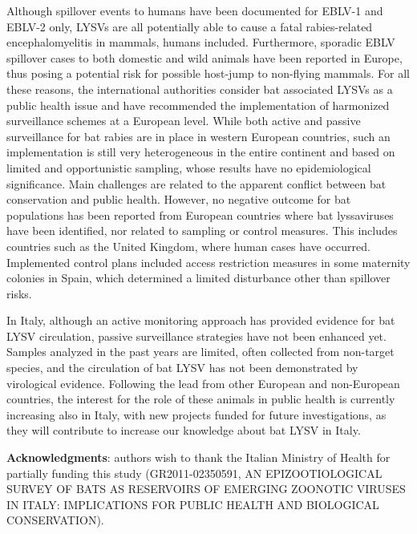 {Although spillover events to humans have been documented for EBLV-1 and EBLV-2 only, LYSVs are all potentially able to cause a fatal rabies-related encephalomyelitis in mammals, humans included. Furthermore, sporadic EBLV spillover cases to both domestic and wild animals have been reported in Europe, thus posing a potential risk for possible host-jump to non-flying mammals. For all these reasons, the international authorities consider bat associated LYSVs as a public health issue and have recommended the implementation of harmonized surveillance schemes at a European level. While both active and passive surveillance for bat rabies are in place in western European countries, such an implementation is still very heterogeneous in the entire continent and based on limited and opportunistic sampling, whose results have no epidemiological significance. Main challenges are related to the apparent conflict between bat conservation and public health. However, no negative outcome for bat populations has been reported from European countries where bat lyssaviruses have been identified, nor related to sampling or control measures. This includes countries such as the United Kingdom, where human cases have occurred. Implemented control plans included access restriction measures in some maternity colonies in Spain, which determined a limited disturbance other than spillover risks.

In Italy, although an active monitoring approach has provided evidence for bat LYSV circulation, passive surveillance strategies have not been enhanced yet. Samples analyzed in the past years are limited, often collected from non-target species, and the circulation of bat LYSV has not been demonstrated by virological evidence. Following the lead from other European and non-European countries, the interest for the role of these animals in public health is currently increasing also in Italy, with new projects funded for future investigations, as they will contribute to increase our knowledge about bat LYSV in Italy.

\vskip3mm
\begin{footnotesize}
\textbf{Acknowledgments}: authors wish to thank the Italian Ministry of Health for partially funding this study (GR2011-02350591, AN EPIZOOTIOLOGICAL SURVEY OF BATS AS RESERVOIRS OF EMERGING ZOONOTIC VIRUSES IN ITALY: IMPLICATIONS FOR PUBLIC HEALTH AND BIOLOGICAL CONSERVATION).
\end{footnotesize}
} %